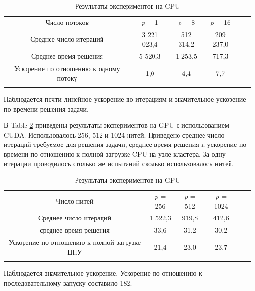 \documentclass{llncs}
\begin{document}
\begin{table}
	\caption{Результаты экспериментов на CPU}
	\label{tab:2}
	\center
	\begin{tabular}{cccccc}
		\hline\noalign{\smallskip}
        
		Число потоков & \textit{p} = 1 & \textit{p} = 8 & \textit{p} = 16 \\
	\noalign{\smallskip} \hline \noalign{\smallskip}

		Среднее число итераций  & 3 221 023,4 & 512 314,2 & 209 237,0 \\
		Среднее время решения & 5 520,3 & 1 253,5 & 717,3 \\
		Ускорение по отношению к одному потоку & 1,0 & 4,4 & 7,7 \\
		\noalign{\smallskip}\hline
	\end{tabular}
\end{table}


Наблюдается почти линейное ускорение по итерациям и значительное ускорение по времени решения задачи.

В Table \ref{tab:3} приведены результаты экспериментов на GPU с использованием CUDA. Использовалось 256, 512 и 1024 нитей. Приведено среднее число итераций требуемое для решения задачи, среднее время решения и ускорение по времени по отношению к полной загрузке CPU на узле кластера. За одну итерации проводилось столько же испытаний сколько использовалось нитей.

\begin{table}
	\caption{Результаты экспериментов на GPU}
	\label{tab:3}
	\center
	\begin{tabular}{cccccc}
		\hline\noalign{\smallskip}
        
		Число нитей & \textit{p} = 256 & \textit{p} = 512 & \textit{p} = 1024 \\
	\noalign{\smallskip} \hline \noalign{\smallskip}

		Среднее число итераций  & 1 522,3 & 919,8 & 412,6 \\
		среднее время решения & 33,6 & 31,2 & 30,2 \\
		Ускорение по отношению к полной загрузке ЦПУ & 21,4 & 23,0 & 23,7 \\

		\noalign{\smallskip}\hline
	\end{tabular}
\end{table}

Наблюдается значительное ускорение. Ускорение по отношению к последовательному запуску составило 182.
\end{document}
